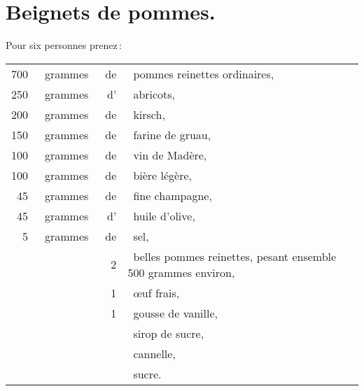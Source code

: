 \section*{\centering Beignets de pommes.}
{}

Pour six personnes prenez :

\footnotesize
\begin{longtable}{rrrp{16em}}
    700 & grammes & de & pommes reinettes ordinaires,                                                     \\
    250 & grammes & d' & abricots,                                                                        \\
    200 & grammes & de & kirsch,                                                                          \\
    150 & grammes & de & farine de gruau,                                                                 \\
    100 & grammes & de & vin de Madère,                                                                   \\
    100 & grammes & de & bière légère,                                                                    \\
     45 & grammes & de & fine champagne,                                                                  \\
     45 & grammes & d' & huile d'olive,                                                                   \\
      5 & grammes & de & sel,                                                                             \\
        &         &  2 & belles pommes reinettes, pesant ensemble 500 grammes environ,                    \\
        &         &  1 & œuf frais,                                                                       \\
        &         &  1 & gousse de vanille,                                                               \\
        &         &    & sirop de sucre,                                                                  \\
        &         &    & cannelle,                                                                        \\
        &         &    & sucre.                                                                           \\
\end{longtable}
\normalsize

